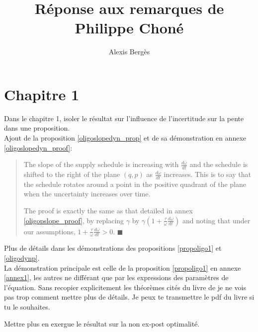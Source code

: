 \documentclass{article}
\newenvironment{proof}[1][Proof]{\begin{trivlist}
\item[\hskip \labelsep {\bfseries #1}]}{\end{trivlist}}
\newcommand{\qed}{$\blacksquare$}
\begin{document}
\title{Réponse aux remarques de Philippe Choné}
\author{Alexis Bergès}

\maketitle

\section{Chapitre 1}

\begin{itemize}

\item Dans le chapitre 1, isoler le résultat sur l'influence de l'incertitude sur la pente dans une proposition.\\

Ajout de la proposition \ref{oligoslopedyn_prop} et de sa démonstration en annexe \ref{oligoslopedyn_proof}:\\
\begin{quote}
The slope of the supply schedule is increasing with $\frac{d\omega}{dt}$ and the schedule is shifted to the right of the plane $(q,p)$ as $\frac{d\omega}{dt}$ increases. This is to say that the schedule rotates around a point in the positive quadrant of the plane when the uncertainty increases over time. 
\begin{proof}
The proof is exactly the same as that detailed in annex \ref{oligopslope_proof}, by replacing $\gamma$ by $\gamma(1+\frac{\tau}{\omega}\frac{d\omega}{dt})$ and noting that under our assumptions, $1+\frac{\tau}{\omega}\frac{d\omega}{dt}>0$. \qed
\end{proof}
\end{quote}

\item Plus de détails dans les démonstrations des propositions \ref{propoligo1} et \ref{oligodynp}.\\

La démonstration principale est celle de la proposition \ref{propoligo1} en annexe \ref{annex1}, les autres ne différant que par les expressions des paramètres de l'équation. Sans recopier explicitement les théorèmes cités du livre de \cite{constraint} je ne vois pas trop comment mettre plus de détails. Je peux te transmettre le pdf du livre si tu le souhaites.

\item Mettre plus en exergue le résultat sur la non ex-post optimalité.\\


\end{itemize}
\end{document}

